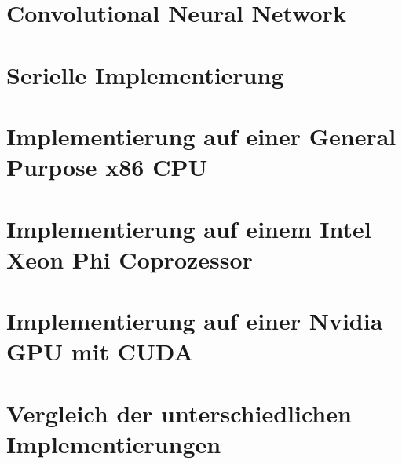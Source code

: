 \documentclass[12pt,oneside, 
liststotoc, 						%
bibtotoc,						%
titlepage, 						%
abstracton,					%
DIV11,						%
BCOR6mm,					%
]{scrreprt}
\begin{document}
\chapter{Convolutional Neural Network}

\clearpage

\chapter{Serielle Implementierung} \label{chap:seriell}

\clearpage

\chapter{Implementierung auf einer General Purpose x86 CPU}

\clearpage

\chapter{Implementierung auf einem Intel Xeon Phi Coprozessor}

\clearpage

\chapter{Implementierung auf einer Nvidia GPU mit CUDA} \label{chap:cuda}

\clearpage

\chapter{Vergleich der unterschiedlichen Implementierungen}

\clearpage

\printbibliography
\clearpage
\end{document}
